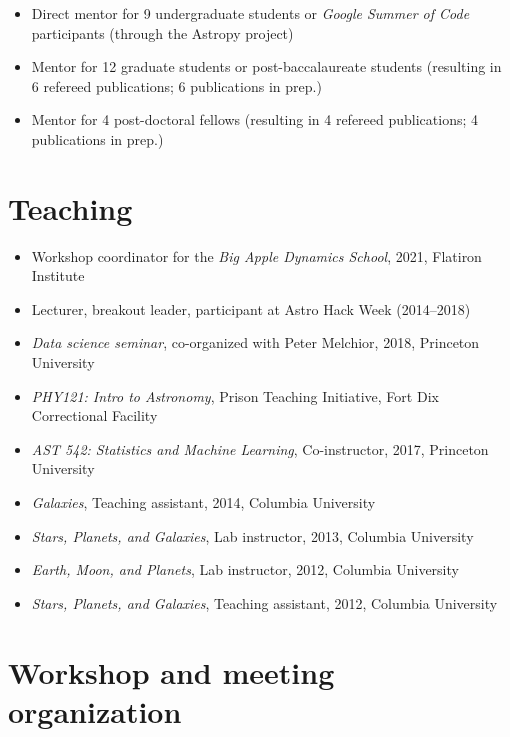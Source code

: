 \documentclass[12pt, letterpaper]{apw-cv}
\begin{document}


\begin{itemize}
    \item Direct mentor for 9 undergraduate students or \textit{Google Summer of Code} participants (through the Astropy project)
    \item Mentor for 12 graduate students or post-baccalaureate students (resulting in 6 refereed publications; 6 publications in prep.)
    \item Mentor for 4 post-doctoral fellows (resulting in 4 refereed publications; 4 publications in prep.)
\end{itemize}

\section*{Teaching}

\begin{itemize}
    \item Workshop coordinator for the \textit{Big Apple Dynamics School}, 2021, Flatiron Institute
    \item Lecturer, breakout leader, participant at Astro Hack Week (2014--2018)
    \item \emph{Data science seminar}, co-organized with Peter Melchior, 2018, Princeton University
    \item \emph{PHY121: Intro to Astronomy}, Prison Teaching Initiative, Fort Dix Correctional Facility
	\item \emph{AST 542: Statistics and Machine Learning}, Co-instructor, 2017, Princeton University
    \item \emph{Galaxies}, Teaching assistant, 2014, Columbia University
	\item \emph{Stars, Planets, and Galaxies}, Lab instructor, 2013, Columbia University
	\item \emph{Earth, Moon, and Planets}, Lab instructor, 2012, Columbia University
	\item \emph{Stars, Planets, and Galaxies}, Teaching assistant, 2012, Columbia University
\end{itemize}

\section*{Workshop and meeting organization}
\end{document}

